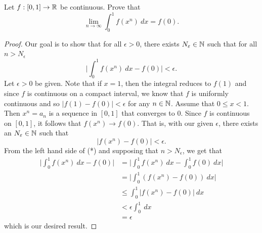 \documentclass[a4paper]{article}
\begin{document}
\begin{problem}
    Let \( f : [0,1] \to \mathbb{R}  \) be continuous. Prove that  
    \[  \lim_{ n \to \infty  } \int_{ 0 }^{ 1 }  f(x^{n})  \ dx = f(0). \]
\end{problem}
\begin{proof}
Our goal is to show that for all \( \epsilon > 0  \), there exists \( {N}_{\varepsilon}  \in \mathbb{N} \) such that for all \( n > {N}_{\epsilon} \)
\[  \Big| \int_{ 0 }^{ 1 }  f(x^{n})  \ dx - f(0) \Big| < \epsilon. \tag{*}  \] 
Let \( \epsilon > 0  \) be given. Note that if \( x = 1  \), then the integral reduces to \( f(1)  \) and since \( f  \) is continuous on a compact interval, we know that \( f  \) is uniformly continuous and so \( | f(1) - f(0) |  < \epsilon \) for any \( n \in \mathbb{N} \). Assume that \( 0 \leq x < 1  \). Then \( x^{n} = {a}_{n}  \) is a sequence in \( [0,1] \) that converges to \( 0 \). Since \( f  \) is continuous on \( [0,1] \), it follows that \( f(x^{n}) \to f(0) \). That is, with our given \( \epsilon  \), there exists an \( {N}_{\varepsilon} \in \mathbb{N} \) such that 
\[  | f(x^{n}) - f(0) |  < \epsilon. \]
From the left hand side of (*) and supposing that \( n > {N}_{\epsilon}  \), we get that 
\begin{align*}
    \Big| \int_{ 0 }^{ 1 } f(x^{n})   \ dx - f(0) \Big| &= \Big| \int_{ 0 }^{ 1 } f(x^{n}) \ dx - \int_{ 0 }^{ 1 }  f(0) \ dx  \Big|  \\
                                                        &= \Big| \int_{ 0 }^{ 1 }  (f(x^{n}) - f(0)) \ dx \Big| \\
                                                        &\leq \int_{ 0 }^{ 1 }  | f(x^{n}) - f(0) |  \ dx \\
                                                        &< \epsilon \int_{ 0 }^{ 1 }   \ dx \\
                                                        &= \epsilon
\end{align*}
which is our desired result.
\end{proof}
\end{document}
